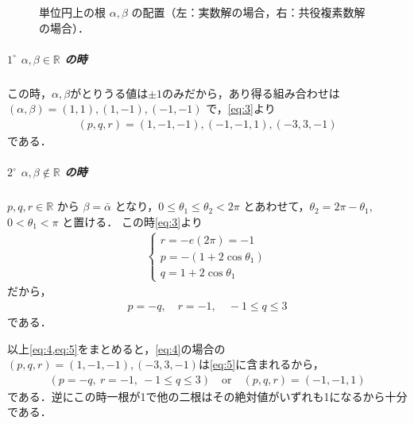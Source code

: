 \documentclass[../../main.tex]{subfiles}
\begin{document}
\begin{figure}[htb]
  \caption{単位円上の根 $\alpha, \beta$ の配置（左：実数解の場合，右：共役複素数解の場合）．}
  \label{fig:1973_2_roots_unit_circle}
\end{figure}

\subparagraph{$1^\circ$ $\alpha, \beta \in \mathbb{R}$ の時}

この時，$\alpha,\beta$がとりうる値は$\pm 1$のみだから，あり得る組み合わせは$(\alpha, \beta) = (1, 1), (1, -1), (-1, -1)$ で，\cref{eq:3}より
\begin{align}
  (p, q, r) = (1, -1, -1), (-1, -1, 1), (-3, 3, -1) \label{eq:4}
\end{align}
である．

\subparagraph{$2^\circ$ $\alpha, \beta \notin \mathbb{R}$ の時}

$p, q, r \in \mathbb{R}$ から $\beta = \bar{\alpha}$ となり，$0 \le \theta_1 \le \theta_2 < 2\pi$ とあわせて，$\theta_2 = 2\pi - \theta_1$, $0 < \theta_1 < \pi$ と置ける．
この時\cref{eq:3}より
\begin{align}
  \begin{cases}
    r = -e(2\pi) = -1 \\
    p = -(1 + 2\cos\theta_1) \\
    q = 1 + 2\cos\theta_1
  \end{cases}
\end{align}
だから，
\begin{align}
  p = -q, \quad r = -1, \quad -1 \le q \le 3 \label{eq:5}
\end{align}
である．
\casesend

以上\cref{eq:4,eq:5}をまとめると，\cref{eq:4}の場合の$(p,q,r)=(1,-1,-1),(-3,3,-1)$は\cref{eq:5}に含まれるから，
\begin{align}
  (p = -q, \ r = -1, \ -1 \le q \le 3) \quad \text{or} \quad (p, q, r) = (-1, -1, 1)
\end{align}
である．逆にこの時一根が1で他の二根はその絶対値がいずれも1になるから十分である．

\newpage
\end{document}
